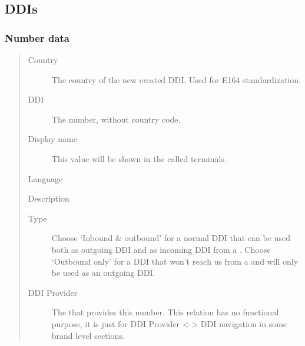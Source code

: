 \documentclass[letterpaper,10pt,spanish]{sphinxmanual}
\begin{document}
\subsection{DDIs}
\label{administration_portal/client/vpbx/ddis:ddis}\label{administration_portal/client/vpbx/ddis::doc}\label{administration_portal/client/vpbx/ddis:pbx-ddis}

\subsubsection{Number data}
\label{administration_portal/client/vpbx/ddis:number-data}\begin{quote}
\begin{description}
\item[{Country}] \leavevmode
The country of the new created DDI. Used for E164 standardization.

\item[{DDI}] \leavevmode
The number, without country code.

\item[{Display name}] \leavevmode
This value will be shown in the called terminals.

\end{description}

Language

Description
\begin{description}
\item[{Type}] \leavevmode
Choose `Inbound \& outbound' for a normal DDI that can be used both as outgoing DDI and as incoming DDI
from a {\hyperref[administration_portal/brand/providers/ddi_providers:ddi\string-providers]{}}. Choose `Outbound only' for a DDI that won't reach us from a
{\hyperref[administration_portal/brand/providers/ddi_providers:ddi\string-providers]{}} and will only be used as an outgoing DDI.

\item[{DDI Provider}] \leavevmode
The {\hyperref[administration_portal/brand/providers/ddi_providers:ddi\string-providers]{}} that provides this number. This relation has no functional purpose, it
is just for DDI Provider \textless{}-\textgreater{} DDI navigation in some brand level sections.

\end{description}
\end{quote}
\end{document}
